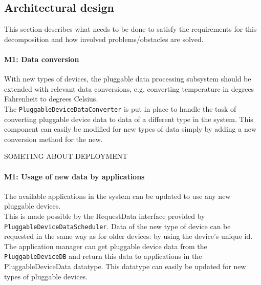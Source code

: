 \subsection{Architectural design}
    This section describes what needs to be done to satisfy the requirements for
    this decomposition and how involved problems/obstacles are solved.

    \paragraph{M1: Data conversion}
        With new types of devices, the pluggable data processing subsystem
        should be extended with relevant data conversions,
        e.g. converting temperature in degrees Fahrenheit to degrees Celsius. \\
        The \texttt{PluggableDeviceDataConverter} is put in place to handle the
        task of converting pluggable device data to data of a different type in the system.
        This component can easily be modified for new types of data simply by
        adding a new conversion method for the new.

        SOMETING ABOUT DEPLOYMENT

    \paragraph{M1: Usage of new data by applications}
        The available applications in the system can be updated to use any
        new pluggable devices. \\
        This is made possible by the RequestData
        interface provided by \texttt{PluggableDeviceDataScheduler}.
        Data of the new type of device can be requested in the same way
        as for older devices: by using the device's unique id.
        The application manager can get pluggable device data from the
        \texttt{PluggableDeviceDB} and return this data to applications in
        the PluggableDeviceData datatype. This datatype can easily be
        updated for new types of pluggable devices.

